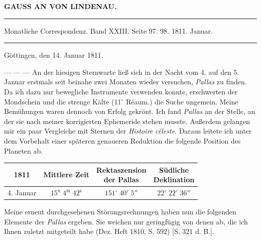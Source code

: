 \clearpage{}
\begin{center}\textbf{GAUSS AN VON LINDENAU.}\par\vspace{4pt}\hrule\vspace{4pt}\fontsize{10}{12}\selectfont Monatliche Correspondenz. Band XXIII. Seite 97. 98. 1811. Januar.\par\vspace{4pt}\hrule\vspace{4pt}\end{center}

\begin{flushright}Göttingen, den 14. Januar 1811.\end{flushright}
\par\indent --- --- --- An der hiesigen Sternwarte ließ sich in der Nacht vom 4. auf den 5. Januar erstmals seit beinahe zwei Monaten wieder versuchen, \emph{Pallas} zu finden. Da ich dazu nur bewegliche Instrumente verwenden konnte, erschwerten der Mondschein und die strenge Kälte (11$^\circ$ Réaum.) die Suche ungemein. Meine Bemühungen waren dennoch von Erfolg gekrönt. Ich fand \emph{Pallas} an der Stelle, an der sie nach meiner korrigierten Ephemeride stehen musste. Außerdem gelangen mir ein paar Vergleiche mit Sternen der \emph{Histoire céleste}. Daraus leitete ich unter dem Vorbehalt einer späteren genaueren Reduktion die folgende Position des Planeten ab.

\begin{center}\fontsize{10}{12}\selectfont\setlength{\tabcolsep}{4pt}\renewcommand{\arraystretch}{1.15}\begin{tabular}{c|c|c|c}
1811 & Mittlere Zeit & \shortstack{Rektaszension\\der Pallas} & \shortstack{Südliche\\Deklination}\\\hline
4. Januar & $15^{\text{u}}\;4^{\text{m}}\;42^{\text{s}}$ & $151^\circ\;40'\;5''$ & $22^\circ\;22'\;36''$\\
\end{tabular}\end{center}

\par\indent Meine erneut durchgesehenen Störungsrechnungen haben nun die folgenden Elemente der \emph{Pallas} ergeben. Sie weichen nur geringfügig von denen ab, die ich Ihnen zuletzt mitgeteilt habe (Dez. Heft 1810, S. 592) [S. 321 d. B.].

